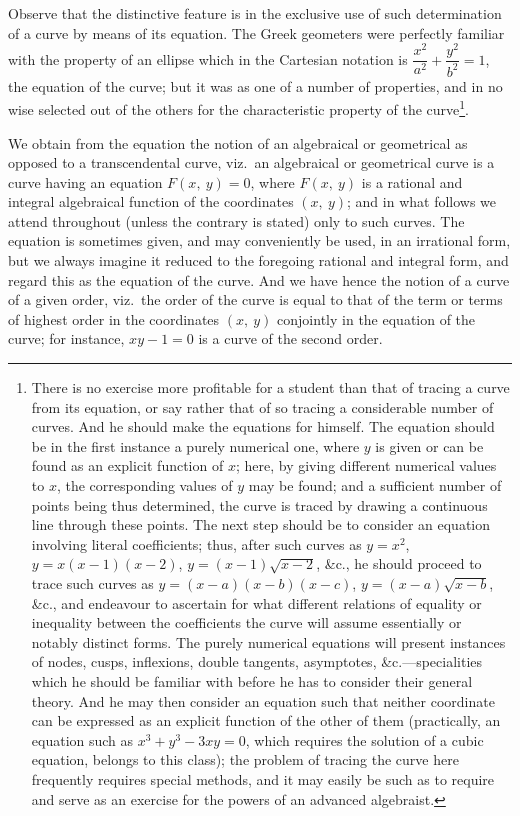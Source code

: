 \documentclass[12pt,a4paper,oneside]{book}
\begin{document}
\newpage
Observe that the distinctive feature is in the exclusive use of such determination of a curve by means of its equation. The Greek geometers were perfectly familiar with the property of an ellipse which in the Cartesian notation is $\dfrac{x^{2}}{a^{2}}+\dfrac{y^{2}}{b^{2}}=1$, the equation of the curve; but it was as one of a number of properties, and in no wise selected out of the others for the characteristic property of the curve\footnote{There is no exercise more profitable for a student than that of tracing a curve from its equation, or say rather that of so tracing a considerable number of curves. And he should make the equations for himself. The equation should be in the first instance a purely numerical one, where $y$ is given or can be found as an explicit function of $x$; here, by giving different numerical values to $x$, the corresponding values of $y$ may be found; and a sufficient number of points being thus determined, the curve is traced by drawing a continuous line through these points. The next step should be to consider an equation involving literal coefficients; thus, after such curves as $y=x^{2}$, $y=x(x-1)(x-2)$, $y=(x-1)\surd{x-2}$, \&c., he should proceed to trace such curves as $y=(x-a)(x-b)(x-c)$, $y=(x-a)\surd{x-b}$, \&c., and endeavour to ascertain for what different relations of equality or inequality between the coefficients the curve will assume essentially or notably distinct forms. The purely numerical equations will present instances of nodes, cusps, inflexions, double tangents, asymptotes, \&c.---specialities which he should be familiar with before he has to consider their general theory. And he may then consider an equation such that neither coordinate can be expressed as an explicit function of the other of them (practically, an equation such as $x^{3}+y^{3}-3xy=0$, which requires the solution of a cubic equation, belongs to this class); the problem of tracing the curve here frequently requires special methods, and it may easily be such as to require and serve as an exercise for the powers of an advanced algebraist.}.

We obtain from the equation the notion of an algebraical or geometrical as opposed to a transcendental curve, viz.\ an algebraical or geometrical curve is a curve having an equation $F(x,\ y)=0$, where $F(x,\ y)$ is a rational and integral algebraical function of the coordinates $(x,\ y)$; and in what follows we attend throughout (unless the contrary is stated) only to such curves. The equation is sometimes given, and may conveniently be used, in an irrational form, but we always imagine it reduced to the foregoing rational and integral form, and regard this as the equation of the curve. And we have hence the notion of a curve of a given order, viz.\ the order of the curve is equal to that of the term or terms of highest order in the coordinates $(x,\ y)$ conjointly in the equation of the curve; for instance, $xy-1=0$ is a curve of the second order.
\end{document}
